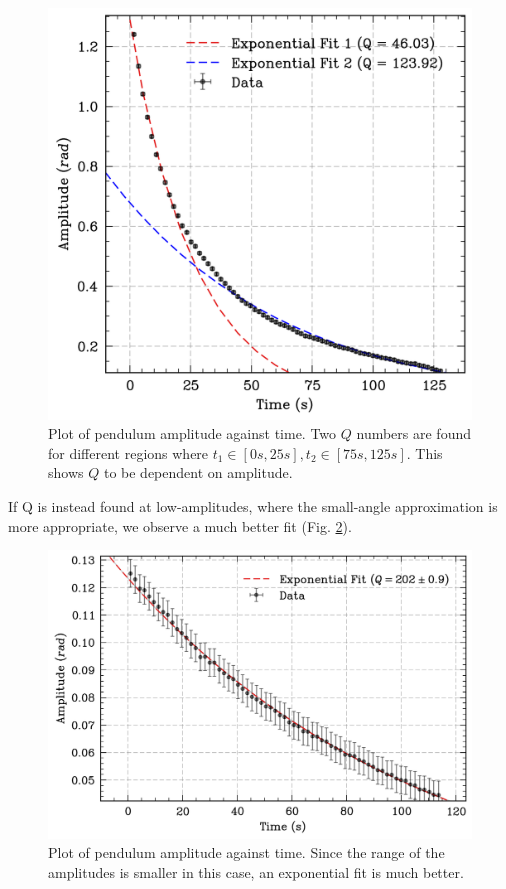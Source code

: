 \documentclass[prl,twocolumn,amsmath,amssymb,superscriptaddress]{revtex4-2}
\begin{document}
\begin{figure}[htb]
    \hspace{-20pt}
    \includegraphics[width=0.8\linewidth]{decay.png}
    \caption{Plot of pendulum amplitude against time. Two $Q$ numbers are found for different regions where $t_1\in[0s,25s], t_2\in[75s,125s]$. This shows $Q$ to be dependent on amplitude.}
    \label{fig:decay}
\end{figure}

If Q is instead found at low-amplitudes, where the small-angle approximation is more appropriate, we observe a much better fit (Fig. \ref{fig:decay_small_angle}).
\begin{figure}[htb]
    \includegraphics[width=0.8\linewidth]{low_angle_q.png}
    \caption{Plot of pendulum amplitude against time. Since the range of the amplitudes is smaller in this case, an exponential fit is much better.}
    \label{fig:decay_small_angle}
\end{figure}
\end{document}

